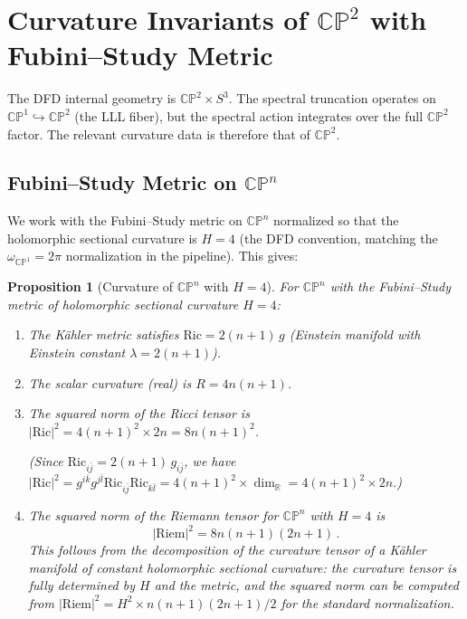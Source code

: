 \documentclass[12pt,a4paper]{article}
\newtheorem{proposition}{Proposition}
\theoremstyle{definition}
\theoremstyle{remark}
\newcommand{\CP}{\mathbb{CP}}
\newcommand{\Ric}{\mathrm{Ric}}
\newcommand{\Riem}{\mathrm{Riem}}
\begin{document}
\section{Curvature Invariants of $\CP^2$ with Fubini--Study Metric}
\label{sec:CP2}

The DFD internal geometry is $\CP^2 \times S^3$. The spectral truncation
operates on $\CP^1 \hookrightarrow \CP^2$ (the LLL fiber), but the spectral
action integrates over the full $\CP^2$ factor. The relevant curvature data
is therefore that of $\CP^2$.

\subsection{Fubini--Study Metric on $\CP^n$}

We work with the Fubini--Study metric on $\CP^n$ normalized so that the
holomorphic sectional curvature is $H = 4$ (the DFD convention, matching the
$\omega_{\CP^1} = 2\pi$ normalization in the pipeline). This gives:

\begin{proposition}[Curvature of $\CP^n$ with $H = 4$]
\label{prop:CPn-curvature}
For $\CP^n$ with the Fubini--Study metric of holomorphic sectional
curvature $H = 4$:
\begin{enumerate}
\item The K\"ahler metric satisfies $\Ric = 2(n+1)\,g$ (Einstein manifold
  with Einstein constant $\lambda = 2(n+1)$).
\item The scalar curvature (real) is $R = 4n(n+1)$.
\item The squared norm of the Ricci tensor is
  $|\Ric|^2 = 4(n+1)^2 \times 2n = 8n(n+1)^2$.

  (Since $\Ric_{i\bar{j}} = 2(n+1)\,g_{i\bar{j}}$, we have
  $|\Ric|^2 = g^{i\bar{k}}g^{j\bar{l}}\Ric_{i\bar{j}}\Ric_{k\bar{l}}
  = 4(n+1)^2 \times \dim_{\mathbb{R}} = 4(n+1)^2 \times 2n$.)
\item The squared norm of the Riemann tensor for $\CP^n$ with $H = 4$ is
  \begin{equation}
  |\Riem|^2 = 8n(n+1)(2n+1)\,.
  \end{equation}
  This follows from the decomposition of the curvature tensor of a
  K\"ahler manifold of constant holomorphic sectional curvature: the
  curvature tensor is fully determined by $H$ and the metric, and the
  squared norm can be computed from
  $|\Riem|^2 = H^2 \times n(n+1)(2n+1)/2$ for the standard normalization.
\end{enumerate}
\end{proposition}
\end{document}

